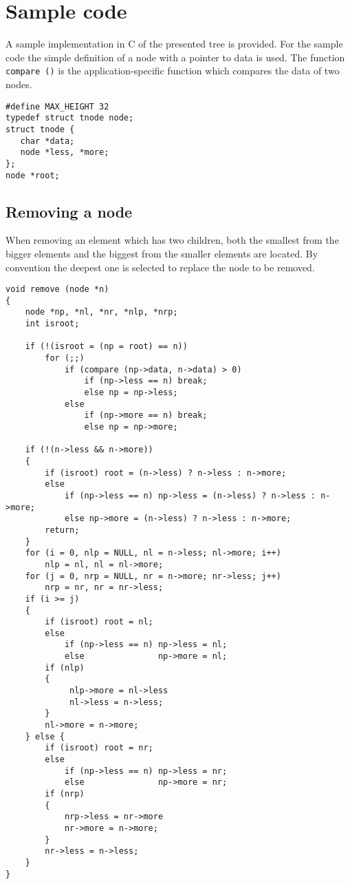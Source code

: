 \documentclass[twocolumn]{article}
\begin{document}
\onecolumn
\section{Sample code}

A sample implementation in C of the presented tree is provided.
For the sample code the simple definition of a node with a pointer to
data is used. The function {\tt compare ()} is the application-specific
function which compares the data of two nodes.

\begin{verbatim}
#define MAX_HEIGHT 32
typedef struct tnode node;
struct tnode {
   char *data;
   node *less, *more;
};
node *root;
\end{verbatim}

\subsection{Removing a node}
\label{app:rmv}

When removing an element which has two children,
both the smallest from the bigger elements and the
biggest from the smaller elements are located. By convention the deepest one
is selected to replace the node to be removed.

\begin{verbatim}
void remove (node *n)
{
    node *np, *nl, *nr, *nlp, *nrp;
    int isroot;

    if (!(isroot = (np = root) == n))
        for (;;)
            if (compare (np->data, n->data) > 0)
                if (np->less == n) break;
                else np = np->less;
            else
                if (np->more == n) break;
                else np = np->more;

    if (!(n->less && n->more))
    {
        if (isroot) root = (n->less) ? n->less : n->more;
        else
            if (np->less == n) np->less = (n->less) ? n->less : n->more;
            else np->more = (n->less) ? n->less : n->more;
        return;
    }
    for (i = 0, nlp = NULL, nl = n->less; nl->more; i++)
        nlp = nl, nl = nl->more;
    for (j = 0, nrp = NULL, nr = n->more; nr->less; j++)
        nrp = nr, nr = nr->less;
    if (i >= j)
    {
        if (isroot) root = nl;
        else
            if (np->less == n) np->less = nl;
            else               np->more = nl;
        if (nlp)
        {
             nlp->more = nl->less
             nl->less = n->less;
        }
        nl->more = n->more;
    } else {
        if (isroot) root = nr;
        else
            if (np->less == n) np->less = nr;
            else               np->more = nr;
        if (nrp)
        {
            nrp->less = nr->more
            nr->more = n->more;
        }
        nr->less = n->less;
    }
}
\end{verbatim}
\end{document}
